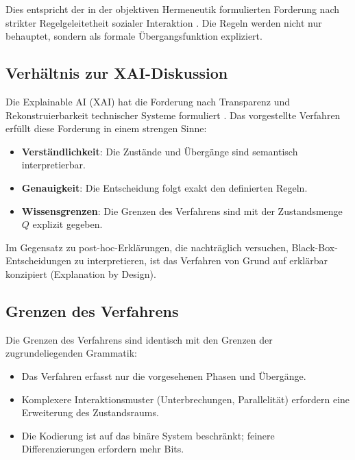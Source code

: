 \documentclass[
  12pt,
  a4paper,
  oneside,
  titlepage
]{article}
\begin{document}
Dies entspricht der in der objektiven Hermeneutik formulierten 
Forderung nach strikter Regelgeleitetheit sozialer Interaktion 
\citep[ S.~372]{Oevermann1979}. Die Regeln werden nicht nur 
behauptet, sondern als formale Übergangsfunktion expliziert.

\subsection{Verhältnis zur XAI-Diskussion}

Die Explainable AI (XAI) hat die Forderung nach Transparenz und 
Rekonstruierbarkeit technischer Systeme formuliert 
\citep{Samek2019, BarredoArrieta2020}. Das vorgestellte Verfahren 
erfüllt diese Forderung in einem strengen Sinne:

\begin{itemize}
    \item \textbf{Verständlichkeit}: Die Zustände und Übergänge 
    sind semantisch interpretierbar.
    
    \item \textbf{Genauigkeit}: Die Entscheidung folgt exakt den 
    definierten Regeln.
    
    \item \textbf{Wissensgrenzen}: Die Grenzen des Verfahrens sind 
    mit der Zustandsmenge \(Q\) explizit gegeben.
\end{itemize}

Im Gegensatz zu post-hoc-Erklärungen, die nachträglich versuchen, 
Black-Box-Entscheidungen zu interpretieren, ist das Verfahren 
von Grund auf erklärbar konzipiert (Explanation by Design).

\subsection{Grenzen des Verfahrens}

Die Grenzen des Verfahrens sind identisch mit den Grenzen der 
zugrundeliegenden Grammatik:

\begin{itemize}
    \item Das Verfahren erfasst nur die vorgesehenen Phasen und 
    Übergänge.
    
    \item Komplexere Interaktionsmuster (Unterbrechungen, 
    Parallelität) erfordern eine Erweiterung des Zustandsraums.
    
    \item Die Kodierung ist auf das binäre System beschränkt; 
    feinere Differenzierungen erfordern mehr Bits.
\end{itemize}
\end{document}
